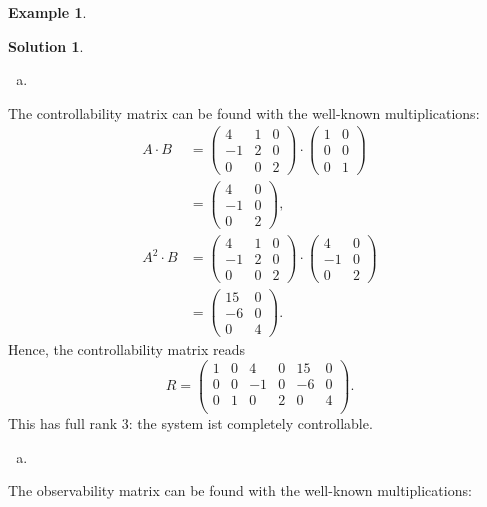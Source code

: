 \documentclass[a4paper,12 pt]{article}
\numberwithin{equation}{section}
\theoremstyle{definition}
\newtheorem{bsp}{Example}
\theoremstyle{remark}
\theoremstyle{definition}
\newtheorem*{lsg}{Solution}
\theoremstyle{definition}
\theoremstyle{definition}
\theoremstyle{remark}
\begin{document}
\begin{bsp}
\begin{lsg}
\begin{enumerate}[(b)]
\item
\end{enumerate}
The controllability matrix can be found with the well-known multiplications:
\begin{equation*}
\begin{split}
A\cdot B&=\begin{pmatrix}
4&1&0\\
-1&2&0\\
0&0&2
\end{pmatrix}\cdot \begin{pmatrix}
1&0\\
0&0\\
0&1
\end{pmatrix}\\
&=\begin{pmatrix}
4&0\\
-1&0\\
0&2
\end{pmatrix},\\
A^2\cdot B&=\begin{pmatrix}
4&1&0\\
-1&2&0\\
0&0&2
\end{pmatrix}\cdot \begin{pmatrix}
4&0\\
-1&0\\
0&2
\end{pmatrix} \\
&=\begin{pmatrix}
15&0\\
-6&0\\
0&4
\end{pmatrix}.
\end{split}
\end{equation*}
Hence, the controllability matrix reads
\begin{equation*}
R=\begin{pmatrix}
1&0&4&0&15&0\\
0&0&-1&0&-6&0\\
0&1&0&2&0&4\\
\end{pmatrix}.
\end{equation*}
This has full rank 3: the system ist completely controllable.
\begin{enumerate}[(c)]
\item
\end{enumerate}
The observability matrix can be found with the well-known multiplications:
\begin{equation*}

\end{equation*}
\end{lsg}
\end{bsp}
\end{document}
